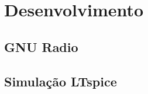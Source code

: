 \section{Desenvolvimento}
\label{sec:desenvolvimento}

\subsection{GNU Radio}



\subsection{Simulação LTspice}
